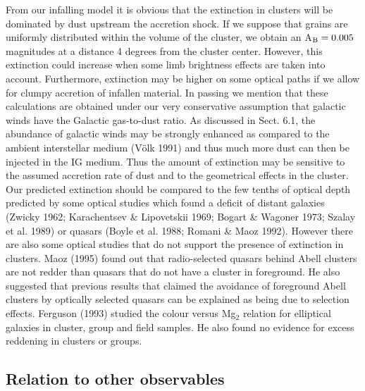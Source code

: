 \documentclass[]{aa}
\begin{document}
From our infalling model it is obvious that the extinction in clusters will be
dominated by dust upstream the accretion shock. If we suppose that grains are
uniformly distributed within the volume of the cluster, we obtain an 
A$_{\rm B}= 0.005$ magnitudes at a distance 4 degrees from the cluster center.
 However, this extinction could increase when some limb brightness effects 
are taken into account. Furthermore, extinction may be higher on some optical 
paths if we allow for clumpy accretion of infallen material. In passing we
mention that these calculations are obtained under our very conservative assumption
that galactic winds have the Galactic gas-to-dust ratio. As discussed in
Sect. 6.1, the abundance of galactic winds may be strongly enhanced as compared
to the ambient interstellar medium (V\"olk 1991) and thus much more dust can
then be injected in the IG medium. Thus the amount of extinction may be
sensitive to the assumed accretion rate of dust and to the geometrical 
effects in
the cluster. Our predicted extinction should be compared to the few tenths of 
optical depth predicted by some optical studies which found a deficit of 
distant galaxies (Zwicky 1962; Karachentsev \& Lipovetskii 1969; 
Bogart \& Wagoner 1973; Szalay et al. 1989) or quasars (Boyle et al. 1988; 
Romani \& Maoz 1992). However there are also 
some optical studies that do not support the presence of extinction in 
clusters. Maoz (1995) found out that radio-selected
quasars behind Abell clusters are not redder than quasars that do not have a
cluster in foreground. He also suggested that previous results that
claimed the avoidance of foreground Abell clusters by optically selected
quasars can be explained as being due to selection effects. Ferguson (1993)
studied the colour versus Mg$_2$ relation for elliptical galaxies in cluster,
group and field samples. He also found no evidence for excess reddening in 
clusters or groups. 

\subsection{Relation to other observables}
\end{document}
